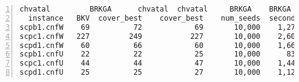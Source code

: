 
\begin{table*}[h!]
\vspace*{2.5ex} 
\caption{
This is an extension of~Table~\ref{tb_bgmc_data}.
The {rows~3--5} refer to three large instances from the 
OR-library~\cite{OPUS-setc-2014-orlib-Beasley}.
The {rows~6--8} introduce {\it almost identical} instances
related to instances on rows  {rows~3--5} with the exception that now 
{\it all weights are set to 1.}
For %
details, see the article.
%
%
%
%
}
\hspace*{6.0em}
\begin{minipage}{0.73\textwidth}
\begin{Verbatim}[frame=lines, fontsize=\footnotesize,numbers=left,
numbersep=3pt,firstline=1,xleftmargin=9mm] 
                     chvatal         BRKGA      chvatal  chvatal     BRKGA    BRKGA
  instance   BKV  cover_best    cover_best    num_seeds  seconds  num_gens  seconds 
scpb1.cnfW    69          72            69       10,000    1,271       200    2,505 
scpc1.cnfW   227         249           227       10,000    2,601       200    5,274    
scpd1.cnfW    60          66            60       10,000    1,666       200    5,377  
scpb1.cnfU    22          22            25       10,000      838       200    3,078     
scpc1.cnfU    44          44            47       10,000    1,444       200    4,764   
scpd1.cnfU    25          25            27       10,000    1,120       200    5,713           
\end{Verbatim}
\end{minipage}
\label{tb_bgmc_data_BRKGA}
\vspace*{2ex}
\end{table*}

